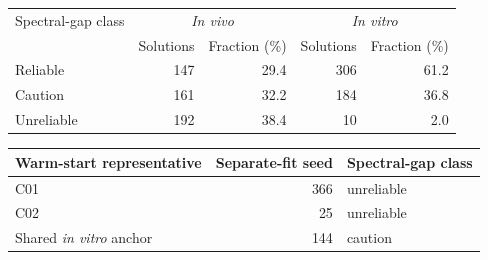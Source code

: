 \begin{table}[!htbp]
\begin{tabular}{@{}lrrrr@{}}
Spectral-gap class & \multicolumn{2}{c}{\textit{In vivo}} & \multicolumn{2}{c}{\textit{In vitro}} \\
 & Solutions & Fraction (\%) & Solutions & Fraction (\%) \\
\midrule
Reliable & 147 & 29.4 & 306 & 61.2 \\
Caution & 161 & 32.2 & 184 & 36.8 \\
Unreliable & 192 & 38.4 & 10 & 2.0 \\
\bottomrule
\end{tabular}
\vspace{0.8em}
\begin{tabular}{@{}lrl@{}}
\toprule
Warm-start representative & Separate-fit seed & Spectral-gap class \\
\midrule
C01 & 366 & unreliable \\
C02 & 25 & unreliable \\
Shared \textit{in vitro} anchor & 144 & caution \\
\bottomrule
\end{tabular}
\end{table}
